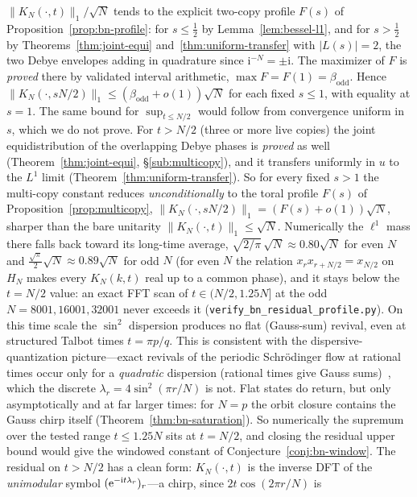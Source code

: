 \begin{remark}
$\|K_N(\cdot,t)\|_1/\sqrt N$ tends to the explicit two-copy profile $F(s)$ of Proposition~\ref{prop:bn-profile}:
for $s\le\tfrac12$ by Lemma~\ref{lem:bessel-l1}, and for $s>\tfrac12$ by Theorems~\ref{thm:joint-equi}
and~\ref{thm:uniform-transfer} with $|L(s)|=2$, the two Debye envelopes adding in quadrature since
$\mathrm i^{-N}=\pm\mathrm i$. The maximizer of $F$ is \emph{proved} there by validated interval arithmetic,
$\max F=F(1)=\beta_{\mathrm{odd}}$. Hence $\|K_N(\cdot,sN/2)\|_1\le(\beta_{\mathrm{odd}}+o(1))\sqrt N$ for each
fixed $s\le1$, with equality at $s=1$. The same bound for $\sup_{t\le N/2}$ would follow from convergence uniform
in $s$, which we do not prove. For $t>N/2$ (three or more live copies) the joint equidistribution of the
overlapping Debye phases is \emph{proved} as well (Theorem~\ref{thm:joint-equi}, \S\ref{sub:multicopy}), and it
transfers uniformly in $u$ to the $L^1$ limit (Theorem~\ref{thm:uniform-transfer}). So for every fixed $s>1$ the
multi-copy constant reduces \emph{unconditionally} to the toral profile $F(s)$ of
Proposition~\ref{prop:multicopy}, $\|K_N(\cdot,sN/2)\|_1=(F(s)+o(1))\sqrt N$, sharper than the bare unitarity
$\|K_N(\cdot,t)\|_1\le\sqrt N$. Numerically the $\ell^1$ mass there falls back toward its long-time average,
$\sqrt{2/\pi}\,\sqrt N\approx0.80\sqrt N$ for even $N$ and $\tfrac{\sqrt\pi}2\sqrt N\approx0.89\sqrt N$ for odd
$N$ (for even $N$ the relation $x_rx_{r+N/2}=x_{N/2}$ on $H_N$ makes every $K_N(k,t)$ real up to a common phase),
and it stays below the $t=N/2$ value: an exact FFT scan of $t\in(N/2,1.25N]$ at the odd $N=8001,16001,32001$
never exceeds it (\texttt{verify\_bn\_residual\_profile.py}). On this time scale the
$\sin^2$ dispersion produces no flat (Gauss-sum) revival, even at structured Talbot times $t=\pi p/q$. This is
consistent with the dispersive-quantization picture---exact revivals of the periodic Schr\"odinger flow at
rational times occur only for a \emph{quadratic} dispersion (rational times give Gauss sums)~\cite{Olver},
which the discrete $\lambda_r=4\sin^2(\pi r/N)$ is not. Flat states do return, but only asymptotically and at
far larger times: for $N=p$ the orbit closure contains the Gauss chirp itself (Theorem~\ref{thm:bn-saturation}).
So numerically the supremum over the tested range $t\le1.25N$ sits at $t=N/2$, and closing the residual upper
bound would give the windowed constant of Conjecture~\ref{conj:bn-window}.
The residual on $t>N/2$ has a clean form: $K_N(\cdot,t)$ is the inverse DFT
of the \emph{unimodular} symbol $(\mathrm{e}^{-\mathrm i t\lambda_r})_r$---a chirp, since $2t\cos(2\pi r/N)$ is

\end{remark}
